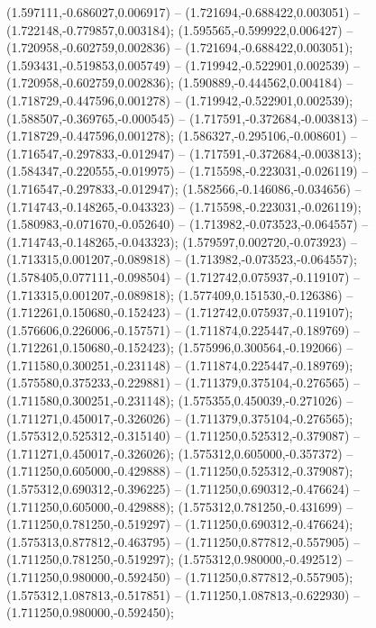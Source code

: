  (1.597111,-0.686027,0.006917) -- (1.721694,-0.688422,0.003051) -- (1.722148,-0.779857,0.003184);
 (1.595565,-0.599922,0.006427) -- (1.720958,-0.602759,0.002836) -- (1.721694,-0.688422,0.003051);
 (1.593431,-0.519853,0.005749) -- (1.719942,-0.522901,0.002539) -- (1.720958,-0.602759,0.002836);
 (1.590889,-0.444562,0.004184) -- (1.718729,-0.447596,0.001278) -- (1.719942,-0.522901,0.002539);
 (1.588507,-0.369765,-0.000545) -- (1.717591,-0.372684,-0.003813) -- (1.718729,-0.447596,0.001278);
 (1.586327,-0.295106,-0.008601) -- (1.716547,-0.297833,-0.012947) -- (1.717591,-0.372684,-0.003813);
 (1.584347,-0.220555,-0.019975) -- (1.715598,-0.223031,-0.026119) -- (1.716547,-0.297833,-0.012947);
 (1.582566,-0.146086,-0.034656) -- (1.714743,-0.148265,-0.043323) -- (1.715598,-0.223031,-0.026119);
 (1.580983,-0.071670,-0.052640) -- (1.713982,-0.073523,-0.064557) -- (1.714743,-0.148265,-0.043323);
 (1.579597,0.002720,-0.073923) -- (1.713315,0.001207,-0.089818) -- (1.713982,-0.073523,-0.064557);
 (1.578405,0.077111,-0.098504) -- (1.712742,0.075937,-0.119107) -- (1.713315,0.001207,-0.089818);
 (1.577409,0.151530,-0.126386) -- (1.712261,0.150680,-0.152423) -- (1.712742,0.075937,-0.119107);
 (1.576606,0.226006,-0.157571) -- (1.711874,0.225447,-0.189769) -- (1.712261,0.150680,-0.152423);
 (1.575996,0.300564,-0.192066) -- (1.711580,0.300251,-0.231148) -- (1.711874,0.225447,-0.189769);
 (1.575580,0.375233,-0.229881) -- (1.711379,0.375104,-0.276565) -- (1.711580,0.300251,-0.231148);
 (1.575355,0.450039,-0.271026) -- (1.711271,0.450017,-0.326026) -- (1.711379,0.375104,-0.276565);
 (1.575312,0.525312,-0.315140) -- (1.711250,0.525312,-0.379087) -- (1.711271,0.450017,-0.326026);
 (1.575312,0.605000,-0.357372) -- (1.711250,0.605000,-0.429888) -- (1.711250,0.525312,-0.379087);
 (1.575312,0.690312,-0.396225) -- (1.711250,0.690312,-0.476624) -- (1.711250,0.605000,-0.429888);
 (1.575312,0.781250,-0.431699) -- (1.711250,0.781250,-0.519297) -- (1.711250,0.690312,-0.476624);
 (1.575313,0.877812,-0.463795) -- (1.711250,0.877812,-0.557905) -- (1.711250,0.781250,-0.519297);
 (1.575312,0.980000,-0.492512) -- (1.711250,0.980000,-0.592450) -- (1.711250,0.877812,-0.557905);
 (1.575312,1.087813,-0.517851) -- (1.711250,1.087813,-0.622930) -- (1.711250,0.980000,-0.592450);
